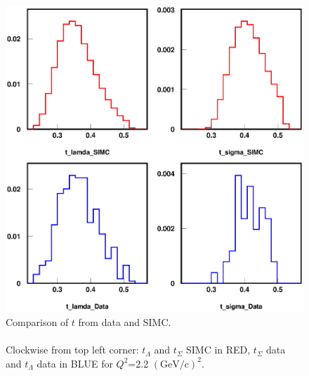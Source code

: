 \begin{figure}[!tbp]
  \centering
  \includegraphics[width=0.8\columnwidth]{com_plot_t_2}
  \caption[Comparison of $t$ from data and SIMC.]{\label{fig:com_plot_t_2}Comparison of $t$ from data and SIMC.\\\\ Clockwise from top left corner: $t_\Lambda$ and $t_\Sigma$ SIMC in RED, $t_\Sigma$ data and $t_\Lambda$ data in BLUE for $Q^2$=2.2 $(\mathrm{GeV/c})^2$.}
\end{figure}

